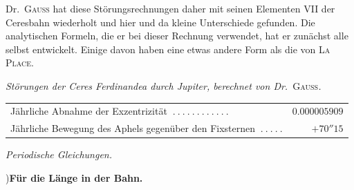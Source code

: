 Dr.\ \textsc{Gauß} hat diese Störungsrechnungen daher mit seinen Elementen VII der Ceresbahn wiederholt und hier und da kleine Unterschiede gefunden. Die analytischen Formeln, die er bei dieser Rechnung verwendet, hat er zunächst alle selbst entwickelt. Einige davon haben eine etwas andere Form als die von \textsc{La Place}.
\begin{center}
\textit{Störungen der Ceres Ferdinandea durch Jupiter, berechnet von Dr.\ }\textsc{Gauß}\textit{.}\par\medskip
{\small\setlength{\tabcolsep}{3pt}
\begin{tabular}{l r}
Jährliche Abnahme der Exzentrizität $\ .\ .\ .\ .\ .\ .\ .\ .\ .\ .\ .\ .$&$0.000005909$\\
Jährliche Bewegung des Aphels gegenüber den Fixsternen $\ .\ .\ .\ .\ .$&$+70''15$
\end{tabular}}
\par{}\bigskip
\textit{Periodische Gleichungen.}\par{})\quad \textbf{Für die Länge in der Bahn.}
\end{center}
